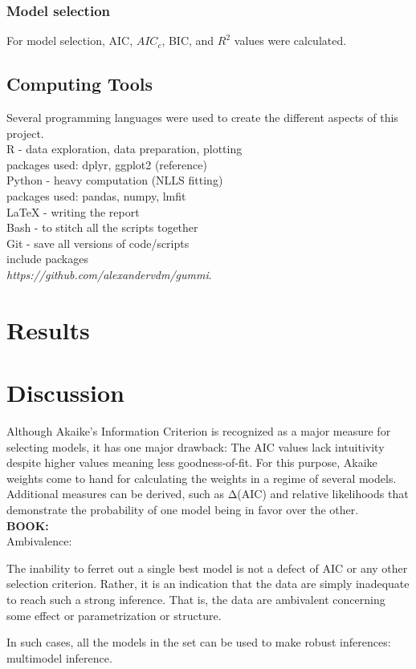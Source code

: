 \documentclass[11pt]{article}
\begin{document}
\begin{linenumbers}
	\subsubsection{Model selection}
	\par For model selection, AIC, $AIC_c$, BIC, and $R^2$ values were calculated. 

	\subsection{Computing Tools}
	Several programming languages were used to create the different aspects of this project.\\
	R - data exploration, data preparation, plotting\\
	packages used: dplyr, ggplot2 (reference)\\
	Python - heavy computation (NLLS fitting)\\
	packages used: pandas, numpy, lmfit\\
	{\LaTeX} - writing the report\\
	Bash - to stitch all the scripts together\\
	Git - save all versions of code/scripts\\
	include packages\\
	\emph{https://github.com/alexandervdm/gummi}.

	\section{Results}
	\section{Discussion}

	Although Akaike's Information Criterion is recognized as a major measure for selecting models, it has one major drawback: The AIC values lack intuitivity despite higher values meaning less goodness-of-fit. For this purpose, Akaike weights come to hand for calculating the weights in a regime of several models. Additional measures can be derived, such as Δ(AIC) and relative likelihoods that demonstrate the probability of one model being in favor over the other.\\

	\textbf{BOOK:}\\
	Ambivalence:
	\par The inability to ferret out a single best model is not a defect of AIC or any other selection criterion. Rather, it is an indication that the data are simply inadequate to reach such a strong inference. That is, the data are ambivalent concerning some effect or parametrization or structure.
	\par In such cases, all the models in the set can be used to make robust inferences: multimodel inference.\\


\end{linenumbers}
\end{document}
